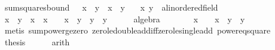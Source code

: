 \begin{isabellebody}
{\isafolddocument}%
%
\isadelimdocument
%
\endisadelimdocument
{}\isamarkupfalse%
\ sum{\isacharunderscore}{\kern0pt}squares{\isacharunderscore}{\kern0pt}bound{\isacharcolon}{\kern0pt}\ {\isachardoublequoteopen}{}\ {\isacharasterisk}{\kern0pt}\ x\ {\isacharasterisk}{\kern0pt}\ y\ {\isasymle}\ x\ {\isacharplus}{\kern0pt}\ y\isanewline
\ \ \ x\ y\ {\isacharcolon}{\kern0pt}{\isacharcolon}{\kern0pt}\ {\isachardoublequoteopen}{\isacharprime}{\kern0pt}a{\isacharcolon}{\kern0pt}{\isacharcolon}{\kern0pt}linordered{\isacharunderscore}{\kern0pt}field{\isachardoublequoteclose}\isanewline
%
\isadelimproof
%
\endisadelimproof
%
\isatagproof
{}\isamarkupfalse%
\ {\isacharminus}{\kern0pt}\isanewline
\ \ \isamarkupfalse%
\ {\isachardoublequoteopen}{\isacharparenleft}{\kern0pt}x\ {\isacharminus}{\kern0pt}\ y{\isacharparenright}{\kern0pt}\ {\isacharequal}{\kern0pt}\ x\ {\isacharasterisk}{\kern0pt}\ x\ {\isacharminus}{\kern0pt}\ {}\ {\isacharasterisk}{\kern0pt}\ x\ {\isacharasterisk}{\kern0pt}\ y\ {\isacharplus}{\kern0pt}\ y\ {\isacharasterisk}{\kern0pt}\ y{\isachardoublequoteclose}\isanewline
\ \ \ \ \isamarkupfalse%
\ algebra\isanewline
\ \ \isamarkupfalse%
\ \isamarkupfalse%
\ {\isachardoublequoteopen}{}\ {\isasymle}\ x\ {\isacharminus}{\kern0pt}\ {}\ {\isacharasterisk}{\kern0pt}\ x\ {\isacharasterisk}{\kern0pt}\ y\ {\isacharplus}{\kern0pt}\ y\isanewline
\ \ \ \ \isamarkupfalse%
\ {\isacharparenleft}{\kern0pt}metis\ sum{\isacharunderscore}{\kern0pt}power{}{\isacharunderscore}{\kern0pt}ge{\isacharunderscore}{\kern0pt}zero\ zero{\isacharunderscore}{\kern0pt}le{\isacharunderscore}{\kern0pt}double{\isacharunderscore}{\kern0pt}add{\isacharunderscore}{\kern0pt}iff{\isacharunderscore}{\kern0pt}zero{\isacharunderscore}{\kern0pt}le{\isacharunderscore}{\kern0pt}single{\isacharunderscore}{\kern0pt}add\ power{}{\isacharunderscore}{\kern0pt}eq{\isacharunderscore}{\kern0pt}square{\isacharparenright}{\kern0pt}\isanewline
\ \ \isamarkupfalse%
\ \isamarkupfalse%
\ {\isacharquery}{\kern0pt}thesis\isanewline
\ \ \ \ \isamarkupfalse%
\ arith\isanewline
{}\isamarkupfalse%
%
\endisatagproof
{\isafoldproof}%
%
\isadelimproof
\isanewline
%
\endisadelimproof

\end{isabellebody}
